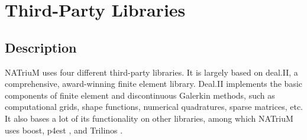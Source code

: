 \documentclass[1p, sort&compress]{elsarticle}
\providecommand{\DIFaddbegin}{} %
\providecommand{\DIFaddend}{} %
\newcommand{\DIFaddincludegraphics}[2][]{{\color{blue}\fbox{\DIFOincludegraphics[#1]{#2}}}} %
\DeclareRobustCommand{\DIFaddbegin}{\DIFOaddbegin \let\includegraphics\DIFaddincludegraphics} %
\DeclareRobustCommand{\DIFaddend}{\DIFOaddend \let\includegraphics\DIFOincludegraphics} %
\begin{document}


\section{Third-Party Libraries}
\DIFaddbegin \label{sec:TPL}
\DIFaddend \subsection{Description}
NATriuM uses four different third-party libraries. It is largely based on deal.II, a comprehensive, award-winning finite element library. 
Deal.II implements the basic components of finite element and discontinuous Galerkin methods, such as computational grids, shape functions, numerical quadratures, sparse matrices, etc. It also bases a lot of its functionality on other libraries, among which NATriuM uses boost, p4est \cite{Burstedde.2011}, and Trilinos \cite{MichaelHeroux.2003}.
\end{document}
